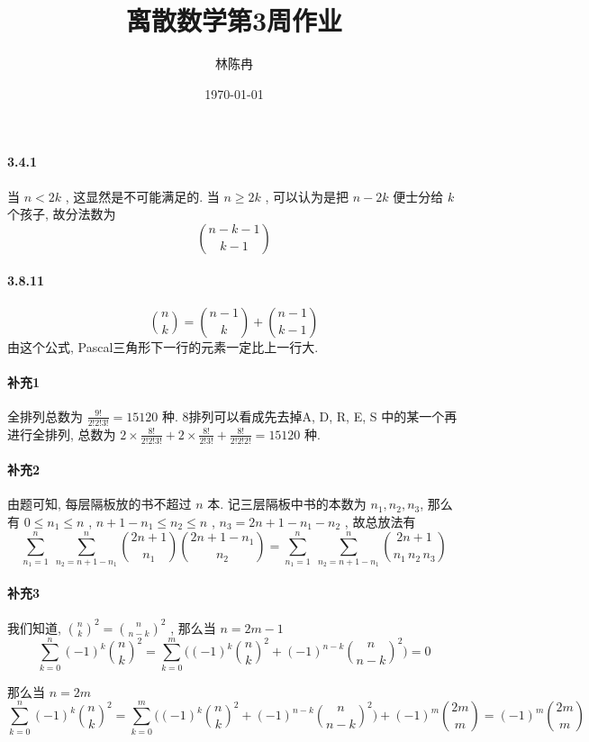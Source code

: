 \documentclass[a4paper, UTF8]{ctexart}				%
\title{离散数学第3周作业}
\author{林陈冉}
\date{\today}
\numberwithin{equation}{section}				%
\begin{document}
    \maketitle										%
    \paragraph{3.4.1}\quad 
        当 $n<2k$ , 这显然是不可能满足的. 当 $n \ge 2k$ , 可以认为是把 $n-2k$ 便士分给 $k$ 个孩子, 故分法数为 
        \[
            {n-k-1 \choose k-1}
        \]
    \paragraph{3.8.11}\quad 
        \[
            {{n} \choose {k}} = {{n-1} \choose {k}} + {{n-1} \choose {k-1}}
        \]
        由这个公式, Pascal三角形下一行的元素一定比上一行大.
    \paragraph{补充1}\quad 
        全排列总数为 $\frac{9!}{2!2!3!} = 15120$ 种. 8排列可以看成先去掉A, D, R, E, S 中的某一个再进行全排列, 总数为 $2 \times \frac{8!}{2!2!3!} + 2 \times \frac{8!}{2!3!} + \frac{8!}{2!2!2!} = 15120$ 种.
    \paragraph{补充2}\quad 
        由题可知, 每层隔板放的书不超过 $n$ 本. 记三层隔板中书的本数为 $n_1, n_2, n_3$, 那么有 $0 \le n_1 \le n$ , $n + 1 - n_1 \le n_2 \le n$ , $n_3 = 2n + 1 - n_1 - n_2$ , 故总放法有 
        \[
            \sum^{n}_{n_1=1} \; \sum^{n}_{n_2=n+1-n_1}
            {2n + 1 \choose n_1}{2n + 1 - n_1 \choose n_2} 
            = \sum^{n}_{n_1=1} \; \sum^{n}_{n_2=n+1-n_1}
            {2n+1 \choose {n_1 \, n_2 \, n_3}}
        \]
        
    \paragraph{补充3}\quad 
        我们知道, ${n \choose k}^2 = {n \choose n - k}^2$ , 那么当 $n = 2m-1$ 
        \[
            \sum^{n}_{k=0} (-1)^k {n \choose k}^2 
            = \sum^{m}_{k=0} \biggl((-1)^k {n \choose k}^2 + (-1)^{n-k} {n \choose n-k}^2\biggl) = 0
        \]

        那么当 $n = 2m$ 
        \[
            \sum^{n}_{k=0} (-1)^k {n \choose k}^2 
            = \sum^{m}_{k=0} \biggl((-1)^k {n \choose k}^2 + (-1)^{n-k} {n \choose n-k}^2\biggl) + (-1)^m {2m \choose m} = (-1)^m {2m \choose m}
        \]
        
\end{document}
